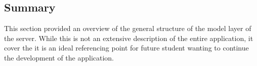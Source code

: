 \subsection{Summary}
This section provided an overview of the general structure of the model layer of the server. While this is not an extensive description of the entire application, it cover the it is an ideal referencing point for future student wanting to continue the development of the application.